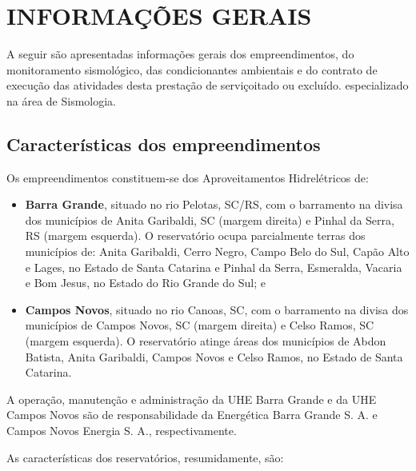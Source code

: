 \section{INFORMAÇÕES GERAIS}
A seguir são apresentadas informações gerais dos empreendimentos, do monitoramento sismológico, das condicionantes ambientais e do contrato de execução das atividades desta prestação de serviçoitado ou excluído. especializado na área de Sismologia.

\subsection{Características dos empreendimentos}
Os empreendimentos constituem-se dos Aproveitamentos Hidrelétricos de:
\begin{itemize}
    \item \textbf{Barra Grande}, situado no rio Pelotas, SC/RS, com o barramento na divisa dos municípios de Anita Garibaldi, SC (margem direita) e Pinhal da Serra, RS (margem esquerda). O reservatório ocupa parcialmente terras dos municípios de: Anita Garibaldi, Cerro Negro, Campo Belo do Sul, Capão Alto e Lages, no Estado de Santa Catarina e Pinhal da Serra, Esmeralda, Vacaria e Bom Jesus, no Estado do Rio Grande do Sul; e
    \item \textbf{Campos Novos}, situado no rio Canoas, SC, com o barramento na divisa dos municípios de Campos Novos, SC (margem direita) e Celso Ramos, SC (margem esquerda). O reservatório atinge áreas dos municípios de Abdon Batista, Anita Garibaldi, Campos Novos e Celso Ramos, no Estado de Santa Catarina.
\end{itemize}

A operação, manutenção e administração da UHE Barra Grande e da UHE Campos Novos são de responsabilidade da Energética Barra Grande S. A. e Campos Novos Energia S. A., respectivamente.

As características dos reservatórios, resumidamente, são:

